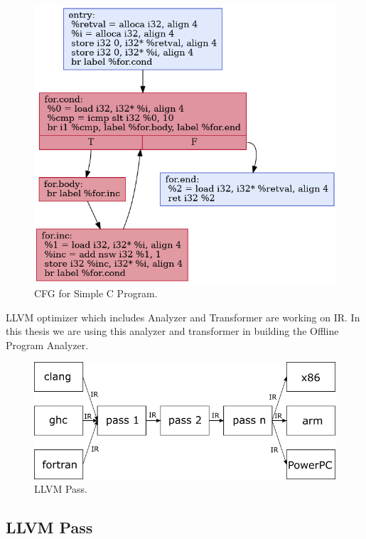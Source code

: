 \begin{figure}[ht]
    \centerline{\includegraphics[scale=.75]{Figures/03/cfg.png}}
    \caption{CFG for Simple C Program.}
    \label{fig:cfg}
\end{figure}


LLVM optimizer \textemdash{} which includes Analyzer and Transformer \textemdash{} are working on IR. In this thesis we are using this analyzer and transformer in building the Offline Program Analyzer.

\begin{figure}[htbp] 
    \centerline{\includegraphics[scale=.75]{Figures/03/llvm-overview.png}} 
    \caption{LLVM Pass.} 
    \label{fig:llvm} 
\end{figure} 

\subsection{LLVM Pass}

